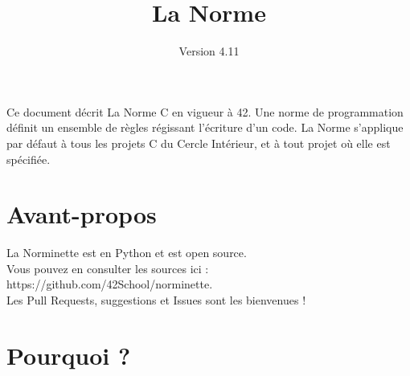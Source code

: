 \documentclass{42-fr}
\begin{document}
\title{La Norme}
\subtitle{Version 4.11}

\summary
{
    Ce document décrit La Norme C en vigueur à 42. Une norme de programmation 
    définit un ensemble de règles régissant l’écriture d’un code. 
    La Norme s'applique par défaut à tous les projets C du
    Cercle Intérieur, et à tout projet où elle est spécifiée.
    
}

\maketitle

\tableofcontents



\chapter{Avant-propos}

    La Norminette est en Python et est open source.\\
    Vous pouvez en consulter les sources ici : https://github.com/42School/norminette.\\
    Les Pull Requests, suggestions et Issues sont les bienvenues !
%
%

    \chapter{Pourquoi ?}
\end{document}
